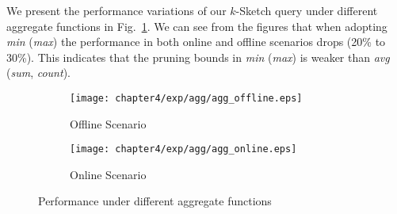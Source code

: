 We present the performance variations of our $k$-Sketch query under different aggregate functions in Fig.~\ref{exp:agg_cmp}. We can see from the figures that when adopting \emph{min} (\emph{max}) the performance in both online and offline scenarios drops (20\% to 30\%). This indicates that the pruning bounds in \emph{min} (\emph{max}) is weaker than \emph{avg} (\emph{sum}, \emph{count}).

\begin{figure}[h]
\centering
    \begin{subfigure}[b]{0.45\textwidth}
        \texttt{[image: chapter4/exp/agg/agg\_offline.eps]}
        \vspace{-1.5em}
        \caption{Offline Scenario}
    \end{subfigure}
    \begin{subfigure}[b]{0.45\textwidth}
        \texttt{[image: chapter4/exp/agg/agg\_online.eps]}
        \vspace{-1.5em}
        \caption{Online Scenario}
    \end{subfigure}
\caption{Performance under different aggregate functions} 
\label{exp:agg_cmp}
\end{figure}








